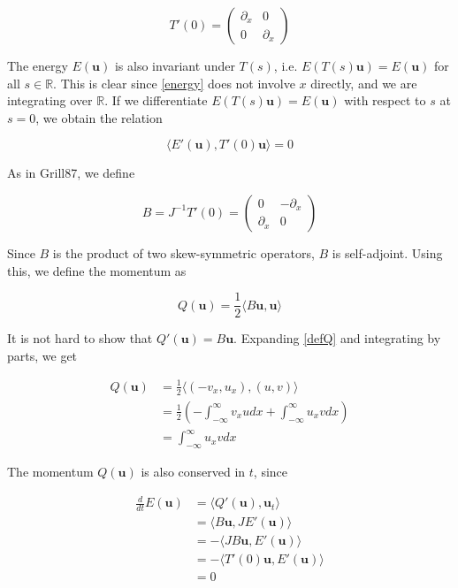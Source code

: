 \documentclass[12pt]{article}
\def\R{{\mathbb R}}
\begin{document}
\begin{equation}
T'(0) = \begin{pmatrix}\partial_x & 0 \\ 0 & \partial_x \end{pmatrix}
\end{equation}

The energy $E(\textbf{u})$ is also invariant under $T(s)$, i.e. $E(T(s) \textbf{u}) = E(\textbf{u})$ for all $s \in \R$. This is clear since \eqref{energy} does not involve $x$ directly, and we are integrating over $\R$. If we differentiate $E(T(s) \textbf{u}) = E(\textbf{u})$ with respect to $s$ at $s = 0$, we obtain the relation

\begin{equation}\label{IP1}
\langle E'(\textbf{u}), T'(0) \textbf{u} \rangle = 0
\end{equation}

As in Grill87, we define 

\begin{equation}\label{defB}
B = J^{-1} T'(0) = \begin{pmatrix}0 & -\partial_x \\ \partial_x & 0\end{pmatrix}
\end{equation}

Since $B$ is the product of two skew-symmetric operators, $B$ is self-adjoint. Using this, we define the momentum as

\begin{equation}\label{defQ}
Q(\textbf{u}) = \frac{1}{2}\langle B \textbf{u}, \textbf{u} \rangle
\end{equation}

It is not hard to show that $Q'(\textbf{u}) = B \textbf{u}$. Expanding \eqref{defQ} and integrating by parts, we get

\begin{align*}
Q(\textbf{u}) &= \frac{1}{2}\langle (-v_x, u_x), (u, v) \rangle \\
&= \frac{1}{2} \left( -\int_{-\infty}^\infty v_x u dx + \int_{-\infty}^\infty u_x v dx \right) \\
&= \int_{-\infty}^\infty u_x v dx
\end{align*}

The momentum $Q(\textbf{u})$ is also conserved in $t$, since

\begin{align*}
\frac{d}{dt} E(\textbf{u}) &= \langle Q'(\textbf{u}), \textbf{u}_t \rangle \\ 
&= \langle B \textbf{u}, J E'(\textbf{u}) \rangle \\
&= -\langle J B \textbf{u}, E'(\textbf{u}) \rangle \\
&= -\langle T'(0) \textbf{u}, E'(\textbf{u}) \rangle \\
&= 0
\end{align*}
\end{document}
